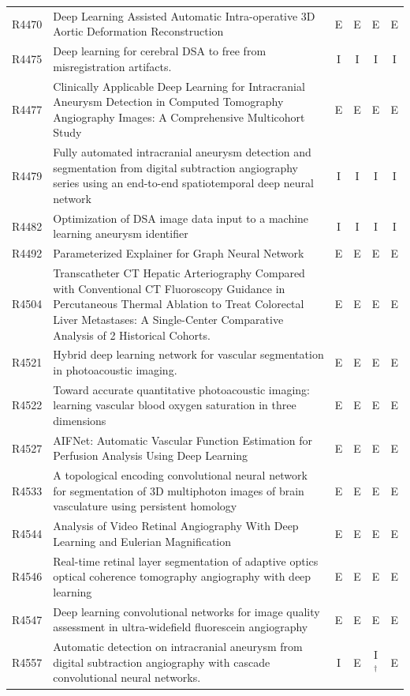 \begin{longtable}{@{}l p{8.6cm} c c c c@{}}
R4470 & Deep Learning Assisted Automatic Intra-operative 3D Aortic Deformation Reconstruction & E & E & E & E \\
R4475 & Deep learning for cerebral DSA to free from misregistration artifacts. & I & I & I & I \\
R4477 & Clinically Applicable Deep Learning for Intracranial Aneurysm Detection in Computed Tomography Angiography Images: A Comprehensive Multicohort Study & E & E & E & E \\
R4479 & Fully automated intracranial aneurysm detection and segmentation from digital subtraction angiography series using an end-to-end spatiotemporal deep neural network & I & I & I & I \\
R4482 & Optimization of DSA image data input to a machine learning aneurysm identifier & I & I & I & I \\
R4492 & Parameterized Explainer for Graph Neural Network & E & E & E & E \\
R4504 & Transcatheter CT Hepatic Arteriography Compared with Conventional CT Fluoroscopy Guidance in Percutaneous Thermal Ablation to Treat Colorectal Liver Metastases: A Single-Center Comparative Analysis of 2 Historical Cohorts. & E & E & E & E \\
R4521 & Hybrid deep learning network for vascular segmentation in photoacoustic imaging. & E & E & E & E \\
R4522 & Toward accurate quantitative photoacoustic imaging: learning vascular blood oxygen saturation in three dimensions & E & E & E & E \\
R4527 & AIFNet: Automatic Vascular Function Estimation for Perfusion Analysis Using Deep Learning & E & E & E & E \\
R4533 & A topological encoding convolutional neural network for segmentation of 3D multiphoton images of brain vasculature using persistent homology & E & E & E & E \\
R4544 & Analysis of Video Retinal Angiography With Deep Learning and Eulerian Magnification & E & E & E & E \\
R4546 & Real-time retinal layer segmentation of adaptive optics optical coherence tomography angiography with deep learning & E & E & E & E \\
R4547 & Deep learning convolutional networks for image quality assessment in ultra-widefield fluorescein angiography & E & E & E & E \\
R4557 & Automatic detection on intracranial aneurysm from digital subtraction angiography with cascade convolutional neural networks. & I & E & I$^{\dagger}$ & E \\

\end{longtable}
